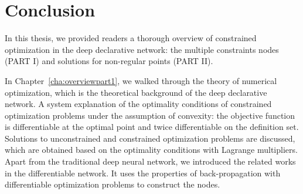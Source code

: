 \chapter{Conclusion}
\label{cha:conc}
In this thesis, we provided readers a thorough overview of constrained optimization in the deep declarative network: the multiple constraints nodes (PART I) and solutions for non-regular points (PART II). 
\par In Chapter~\ref{cha:overviewpart1}, we walked through the theory of numerical optimization, which is the theoretical background of the deep declarative network. A system explanation of the optimality conditions of constrained optimization problems under the assumption of convexity: the objective function is differentiable at the optimal point and twice differentiable on the definition set. Solutions to unconstrained and constrained optimization problems are discussed, which are obtained based on the optimality conditions with Lagrange multipliers. Apart from the traditional deep neural network, we introduced the related works in the differentiable network. It uses the properties of back-propagation with differentiable optimization problems to construct the nodes. 

